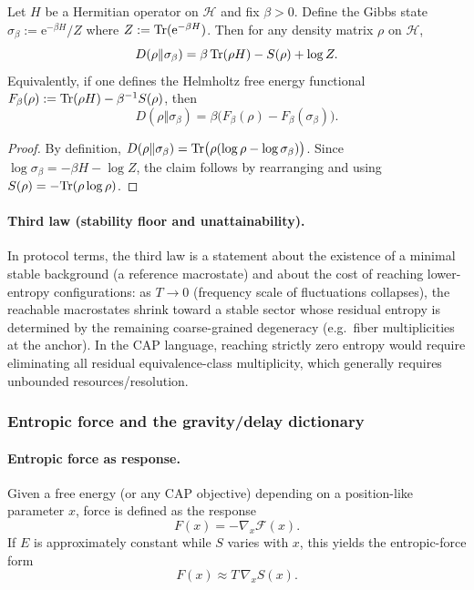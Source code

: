 \begin{proposition}
\label{prop:z128_relative_entropy_free_energy_identity}
\MathTag Let $H$ be a Hermitian operator on $\mathcal{H}$ and fix $\beta>0$.
Define the Gibbs state $\sigma_\beta:=\mathrm{e}^{-\beta H}/Z$ where $Z:=\mathrm{Tr}(\mathrm{e}^{-\beta H})$.
Then for any density matrix $\rho$ on $\mathcal{H}$,
\[
D(\rho\Vert\sigma_\beta)=\beta\,\mathrm{Tr}(\rho H)-S(\rho)+\log Z.
\]
Equivalently, if one defines the Helmholtz free energy functional $F_\beta(\rho):=\mathrm{Tr}(\rho H)-\beta^{-1}S(\rho)$, then
\[
D(\rho\Vert\sigma_\beta)=\beta\bigl(F_\beta(\rho)-F_\beta(\sigma_\beta)\bigr).
\]
\end{proposition}
\begin{proof}
By definition,
$D(\rho\Vert\sigma_\beta)=\mathrm{Tr}\bigl(\rho(\log\rho-\log\sigma_\beta)\bigr)$.
Since $\log\sigma_\beta=-\beta H-\log Z$, the claim follows by rearranging and using $S(\rho)=-\mathrm{Tr}(\rho\log\rho)$.
\end{proof}


\paragraph{Third law (stability floor and unattainability).}
\InterfaceTag In protocol terms, the third law is a statement about the existence of a minimal stable background (a reference macrostate) and about the cost of reaching lower-entropy configurations:
as $T\to 0$ (frequency scale of fluctuations collapses), the reachable macrostates shrink toward a stable sector whose residual entropy is determined by the remaining coarse-grained degeneracy (e.g.\ fiber multiplicities at the anchor).
In the CAP language, reaching strictly zero entropy would require eliminating all residual equivalence-class multiplicity, which generally requires unbounded resources/resolution.

\subsubsection{Entropic force and the gravity/delay dictionary}
\label{subsec:entropic_force_gravity}

\paragraph{Entropic force as response.}
\InterfaceTag Given a free energy (or any CAP objective) depending on a position-like parameter $x$,
force is defined as the response
\[
F(x)=-\nabla_x \mathcal{F}(x).
\]
If $E$ is approximately constant while $S$ varies with $x$, this yields the entropic-force form
\[
F(x)\approx T\,\nabla_x S(x).
\]

